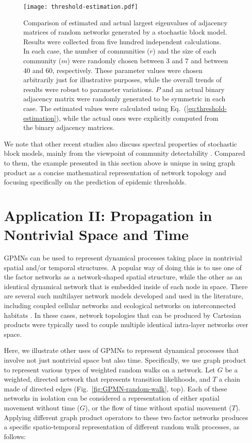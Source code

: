 \documentclass{article}
\begin{document}
\begin{figure}
\centering
\texttt{[image: threshold-estimation.pdf]}
\caption{Comparison of estimated and actual largest eigenvalues of
  adjacency matrices of random networks generated by a stochastic
  block model. Results were collected from five hundred independent
  calculations. In each case, the number of communities ($r$) and the
  size of each community ($m$) were randomly chosen between 3 and 7
  and between 40 and 60, respectively.  These parameter values were
  chosen arbitrarily just for illustrative purposes, while the overall
  trends of results were robust to parameter variations. $P$ and an
  actual binary adjacency matrix were randomly generated to be
  symmetric in each case. The estimated values were calculated using
  Eq.~(\ref{eq:threshold-estimation}), while the actual ones were
  explicitly computed from the binary adjacency matrices.}
\label{fig:threshold-estimation}
\end{figure}

We note that other recent studies also discuss spectral properties of
stochastic block models, mainly from the viewpoint of community
detectability
\cite{nadakuditi2012graph,peixoto2013eigenvalue,ghasemian2016detectability}. Compared
to them, the example presented in this section above is unique in
using graph product as a concise mathematical representation of
network topology and focusing specifically on the prediction of
epidemic thresholds.

\section{Application II: Propagation in Nontrivial Space and Time}
\label{sec:app2}

GPMNs can be used to represent dynamical processes taking place in
nontrivial spatial and/or temporal structures. A popular way of doing
this is to use one of the factor networks as a network-shaped spatial
structure, while the other as an identical dynamical network that is
embedded inside of each node in space. There are several such
multilayer network models developed and used in the literature,
including coupled cellular networks \cite{golubitsky2009bifurcations}
and ecological networks on interconnected habitats
\cite{brechtel2016master}. In these cases, network topologies that can
be produced by Cartesian products were typically used to couple
multiple identical intra-layer networks over space.

Here, we illustrate other uses of GPMNs to represent dynamical
processes that involve not just nontrivial space but also
time. Specifically, we use graph product to represent various types of
weighted random walks on a network. Let $G$ be a weighted, directed
network that represents transition likelihoods, and $T$ a chain made
of directed edges (Fig.~\ref{fig:GPMN-random-walk}, top). Each of
these networks in isolation can be considered a representation of
either spatial movement without time ($G$), or the flow of time
without spatial movement ($T$). Applying different graph product
operators to these two factor networks produces a specific
spatio-temporal representation of different random walk processes, as
follows:
\end{document}
